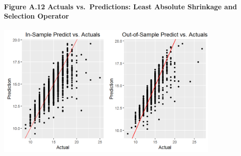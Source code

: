 \documentclass[]{article}
\let\oldparagraph\paragraph
\renewcommand{\paragraph}[1]{\oldparagraph{#1}\mbox{}}
\begin{document}
\paragraph{Figure A.12 Actuals vs.~Predictions: Least Absolute Shrinkage
and Selection
Operator}\label{figure-a.12-actuals-vs.predictions-least-absolute-shrinkage-and-selection-operator}

\includegraphics[height=2.60417in]{images/amt_lasso_sample_pred.png}
\end{document}

